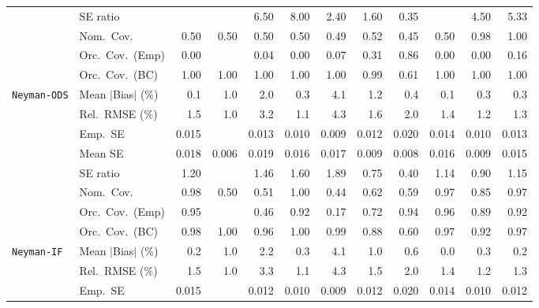 \begin{landscape}
\begin{longtable}{llrrrrrrrrrr}
 & SE ratio &  &  & 6.50 & 8.00 & \cellcolor{rankthree}2.40 & \cellcolor{rankone}1.60 & \cellcolor{ranktwo}0.35 &  & 4.50 & 5.33 \\
 & Nom.\ Cov. & 0.50 & 0.50 & 0.50 & 0.50 & 0.49 & \cellcolor{rankthree}0.52 & 0.45 & 0.50 & \cellcolor{rankone}0.98 & \cellcolor{ranktwo}1.00 \\
 & Orc.\ Cov.\ (Emp) & 0.00 &  & 0.04 & 0.00 & 0.07 & \cellcolor{ranktwo}0.31 & \cellcolor{rankone}0.86 & 0.00 & 0.00 & \cellcolor{rankthree}0.16 \\
 & Orc.\ Cov.\ (BC) & \cellcolor{ranktwo}1.00 & \cellcolor{rankthree}1.00 & 1.00 & 1.00 & 1.00 & \cellcolor{rankone}0.99 & 0.61 & 1.00 & 1.00 & 1.00 \\
\addlinespace[2pt]
\quad \texttt{Neyman-ODS} & Mean $|$Bias$|$ (\%) & \cellcolor{ranktwo}0.1 & 1.0 & 2.0 & 0.3 & 4.1 & 1.2 & 0.4 & \cellcolor{rankone}0.1 & \cellcolor{rankthree}0.3 & 0.3 \\
 & Rel.\ RMSE (\%) & 1.5 & \cellcolor{rankone}1.0 & 3.2 & \cellcolor{ranktwo}1.1 & 4.3 & 1.6 & 2.0 & 1.4 & \cellcolor{rankthree}1.2 & 1.3 \\
 & Emp.\ SE & 0.015 &  & 0.013 & 0.010 & 0.009 & 0.012 & 0.020 & 0.014 & 0.010 & 0.013 \\
 & Mean SE & 0.018 & 0.006 & 0.019 & 0.016 & 0.017 & 0.009 & 0.008 & 0.016 & 0.009 & 0.015 \\
 & SE ratio & 1.20 &  & 1.46 & 1.60 & 1.89 & 0.75 & 0.40 & \cellcolor{ranktwo}1.14 & \cellcolor{rankone}0.90 & \cellcolor{rankthree}1.15 \\
 & Nom.\ Cov. & \cellcolor{rankthree}0.98 & 0.50 & 0.51 & 1.00 & 0.44 & 0.62 & 0.59 & \cellcolor{ranktwo}0.97 & 0.85 & \cellcolor{rankone}0.97 \\
 & Orc.\ Cov.\ (Emp) & \cellcolor{rankone}0.95 &  & 0.46 & 0.92 & 0.17 & 0.72 & \cellcolor{rankthree}0.94 & \cellcolor{ranktwo}0.96 & 0.89 & 0.92 \\
 & Orc.\ Cov.\ (BC) & 0.98 & 1.00 & \cellcolor{rankone}0.96 & 1.00 & 0.99 & 0.88 & 0.60 & \cellcolor{ranktwo}0.97 & 0.92 & \cellcolor{rankthree}0.97 \\
\addlinespace[2pt]
\quad \texttt{Neyman-IF} & Mean $|$Bias$|$ (\%) & \cellcolor{ranktwo}0.2 & 1.0 & 2.2 & 0.3 & 4.1 & 1.0 & 0.6 & \cellcolor{rankone}0.0 & 0.3 & \cellcolor{rankthree}0.2 \\
 & Rel.\ RMSE (\%) & 1.5 & \cellcolor{rankone}1.0 & 3.3 & \cellcolor{ranktwo}1.1 & 4.3 & 1.5 & 2.0 & 1.4 & \cellcolor{rankthree}1.2 & 1.3 \\
 & Emp.\ SE & 0.015 &  & 0.012 & 0.010 & 0.009 & 0.012 & 0.020 & 0.014 & 0.010 & 0.012 \\

\end{longtable}
\end{landscape}
